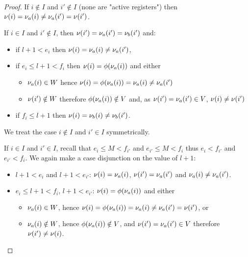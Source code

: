 \begin{proof}
	If $i \notin I$ and $i' \notin I$ (none are "active registers") then  $\nu(i) = \nu_a(i) \ne \nu_a(i') = \nu(i')$.
	
	If $i \in I$ and $i' \notin I$, then $\nu(i') = \nu_a(i') = \nu_b(i')$ and:
	\begin{itemize}
		\item if $l+1<e_i$ then $\nu(i) = \nu_a(i) \ne \nu_a(i')$,
		\item if $e_i \leq l+1 < f_i$ then $\nu(i) = \phi(\nu_a(i))$ and either
		\begin{itemize}
			\item $\nu_a(i) \in W$ hence $\nu(i) = \phi(\nu_a(i)) = \nu_a(i) \neq \nu_a(i')$
			
			\item $\nu(i') \notin W$ therefore $\phi(\nu_a(i)) \notin V$ and, as $\nu(i') = \nu_a(i') \in V$,  $\nu(i) \ne \nu(i')$
		\end{itemize}
		\item if $f_i \leq l+1$ then $\nu(i) = \nu_b(i) \ne \nu_b(i')$.
	\end{itemize}
	We treat the case $i \notin I$ and $i' \in I$ symmetrically.
	
	If $i \in I$ and $i' \in I$, recall that $e_i \leq M < f_{i'}$ and $e_{i'} \leq M < f_i$ thus $e_i < f_{i'}$ and $e_{i'}< f_i$. We again make a case disjunction on the value of $l+1$:
	\begin{itemize}
		\item $l+1<e_i$ and $l+1 <e_{i'}$: $\nu(i)= \nu_a(i)$, $\nu(i')= \nu_a(i')$ and $\nu_a(i) \ne \nu_a(i')$. 
		
		\item $e_i \leq l+1 < f_i$, $l+1<e_{i'}$: $\nu(i) = \phi(\nu_a(i))$ and either
		\begin{itemize}
			\item $\nu_a(i) \in W$, hence $\nu(i) = \phi(\nu_a(i)) = \nu_a(i) \neq  \nu_a(i') = \nu(i')$, or
			
			\item $\nu_a(i) \notin W$, hence $\phi(\nu_a(i)) \notin V$, and $\nu(i') = \nu_a(i') \in V$ therefore $\nu(i') \ne \nu(i)$.
		\end{itemize}
		

\end{itemize}
\end{proof}
